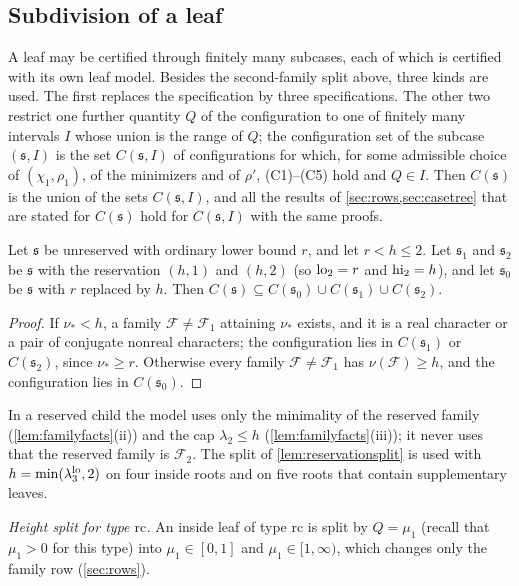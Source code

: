 \subsection{Subdivision of a leaf}\label{subsec:subdivision}
A leaf may be certified through finitely many subcases, each of which is certified with its own
leaf model. Besides the second-family split above, three kinds are used. The first replaces the
specification by three specifications. The other two restrict one further quantity $Q$ of the
configuration to one of finitely many intervals $I$ whose union is the range of $Q$; the
configuration set of the subcase $(\mathfrak s,I)$ is the set $C(\mathfrak s,I)$ of configurations for which, for
some admissible choice of $(\chi_1,\rho_1)$, of the minimizers and of $\rho'$, (C1)--(C5) hold and
$Q\in I$. Then $C(\mathfrak s)$ is the union of the sets $C(\mathfrak s,I)$, and all the results of
\cref{sec:rows,sec:casetree} that are stated for $C(\mathfrak s)$ hold for $C(\mathfrak s,I)$ with the same proofs.

\begin{lemma}\label{lem:reservationsplit}
Let $\mathfrak s$ be unreserved with ordinary lower bound $r$, and let $r<h\le2$. Let $\mathfrak s_1$ and
$\mathfrak s_2$ be $\mathfrak s$ with the reservation $(h,1)$ and $(h,2)$ (so $\mathrm{lo}_2=r$ and $\mathrm{hi}_2=h$), and let $\mathfrak s_0$ be $\mathfrak s$ with
$r$ replaced by $h$. Then $C(\mathfrak s)\subseteq C(\mathfrak s_0)\cup C(\mathfrak s_1)\cup C(\mathfrak s_2)$.
\end{lemma}

\begin{proof}
If $\nu_*<h$, a family $\mathcal F\ne\mathcal F_1$ attaining $\nu_*$ exists, and it is a real character or a pair of
conjugate nonreal characters; the configuration lies in $C(\mathfrak s_1)$ or $C(\mathfrak s_2)$, since
$\nu_*\ge r$. Otherwise every family $\mathcal F\ne\mathcal F_1$ has $\nu(\mathcal F)\ge h$, and the configuration lies in
$C(\mathfrak s_0)$.
\end{proof}

In a reserved child the model uses only the minimality of the reserved family
(\cref{lem:familyfacts}(ii)) and the cap $\lambda_2\le h$ (\cref{lem:familyfacts}(iii)); it never uses
that the reserved family is $\mathcal F_2$. The split of \cref{lem:reservationsplit} is used with $h=\min(\lambda_3^{\mathrm{lo}},2)$ on four inside
roots and on five roots that contain supplementary leaves.

\emph{Height split for type $\mathrm{rc}$.} An inside leaf of type $\mathrm{rc}$ is split by $Q=\mu_1$
(recall that $\mu_1>0$ for this type) into $\mu_1\in[0,1]$ and $\mu_1\in[1,\infty)$, which changes only the
family row (\cref{sec:rows}).

